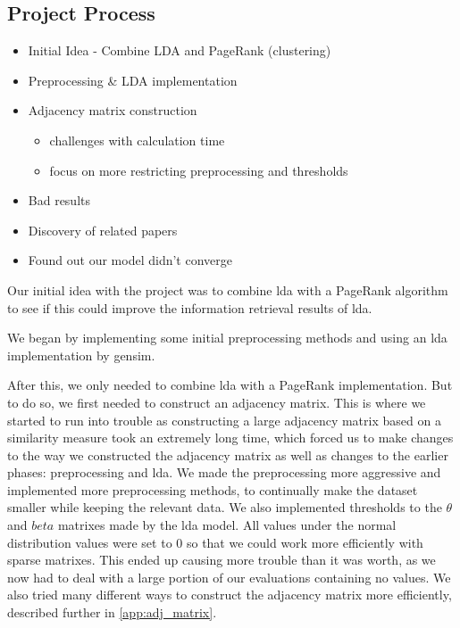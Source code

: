 \subsection{Project Process}
\begin{itemize}
	\item Initial Idea - Combine LDA and PageRank (clustering)
	\item Preprocessing \& LDA implementation
	\item Adjacency matrix construction
	\begin{itemize}
		\item challenges with calculation time
		\item focus on more restricting preprocessing and thresholds
	\end{itemize}
	\item Bad results
	\item Discovery of related papers
	\item Found out our model didn't converge
\end{itemize}

Our initial idea with the project was to combine \gls{lda} with a PageRank algorithm to see if this could improve the information retrieval results of \gls{lda}.

We began by implementing some initial preprocessing methods and using an \gls{lda} implementation by gensim.

After this, we only needed to combine \gls{lda} with a PageRank implementation. 
But to do so, we first needed to construct an adjacency matrix. 
This is where we started to run into trouble as constructing a large adjacency matrix based on a similarity measure took an extremely long time, which forced us to make changes to the way we constructed the adjacency matrix as well as changes to the earlier phases: preprocessing and \gls{lda}.
We made the preprocessing more aggressive and implemented more preprocessing methods, to continually make the dataset smaller while keeping the relevant data.
We also implemented thresholds to the $\theta$ and $beta$ matrixes made by the \gls{lda} model. 
All values under the normal distribution values were set to 0 so that we could work more efficiently with sparse matrixes.
This ended up causing more trouble than it was worth, as we now had to deal with a large portion of our evaluations containing no values.
We also tried many different ways to construct the adjacency matrix more efficiently, described further in \autoref{app:adj_matrix}.

